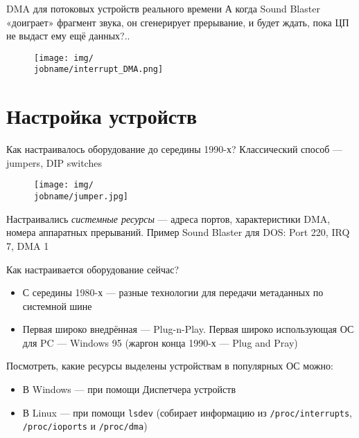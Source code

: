 \documentclass[xetex,aspectratio=43]{beamer}
\begin{document}
\begin{frame}{DMA для потоковых устройств реального времени}
	А когда Sound Blaster «доиграет» фрагмент звука, он сгенерирует
	прерывание, и будет ждать, пока ЦП не выдаст ему ещё данных?..

	\pause

    \begin{figure}
    	\texttt{[image: img/\\jobname/interrupt\_DMA.png]}
    \end{figure}

\end{frame}

\section{Настройка устройств}

\begin{frame}{Как настраивалось оборудование до середины 1990-х?}
	Классический способ --- jumpers, DIP switches

	\begin{figure}
		\centering
		\texttt{[image: img/\\jobname/jumper.jpg]}
	\end{figure}

	Настраивались \emph{системные ресурсы} --- адреса портов, характеристики DMA, номера аппаратных прерываний. Пример Sound Blaster для DOS: Port 220, IRQ 7, DMA 1
\end{frame}

\begin{frame}[fragile]{Как настраивается оборудование сейчас?}
	\begin{itemize}
		\item
		С середины 1980-х --- разные технологии для передачи метаданных по
		системной шине
		\item
		Первая широко внедрённая --- Plug-n-Play. Первая широко использующая            ОС для PC --- Windows 95 (жаргон конца 1990-х --- Plug and Pray)
	\end{itemize}

	\pause

	Посмотреть, какие ресурсы выделены устройствам в популярных ОС можно:

	\begin{itemize}
		\item
		В Windows --- при помощи Диспетчера устройств
		\item
		В Linux --- при помощи \texttt{lsdev} (собирает информацию из
		\texttt{/proc/interrupts}, \texttt{/proc/ioports} и
		\texttt{/proc/dma})
	\end{itemize}
\end{frame}
\end{document}
